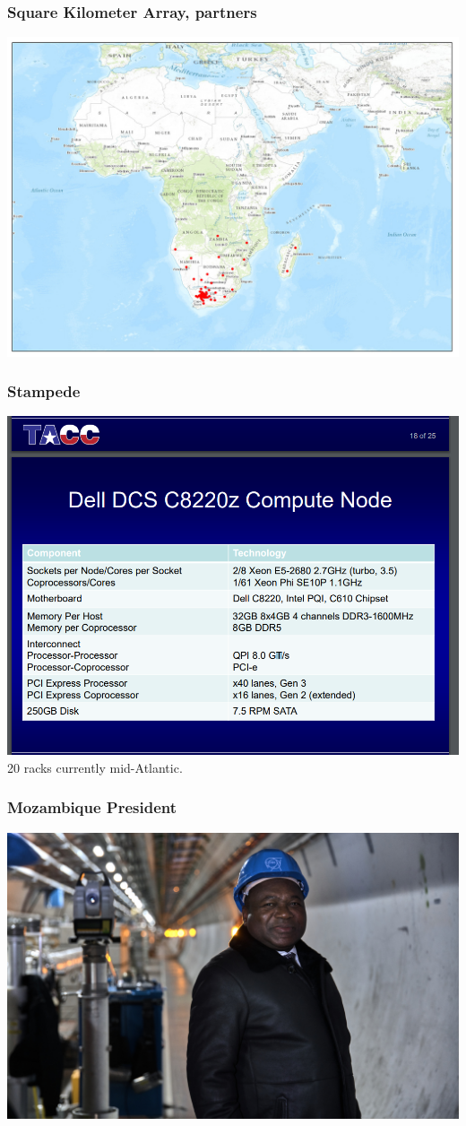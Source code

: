 \documentclass{beamer}
\begin{document}
\begin{frame}
    \frametitle{Square Kilometer Array, partners}
    \includegraphics[scale=0.25]{ska_partners.jpg}
\end{frame}
\begin{frame}
    \frametitle{Stampede} %
    \includegraphics[scale=0.25]{tacc_stampede.png}
    20 racks currently mid-Atlantic.
\end{frame}
\begin{frame}
    \frametitle{Mozambique President}
    \includegraphics[scale=1]{Moz-Pres.jpg}
\end{frame}
\end{document}
